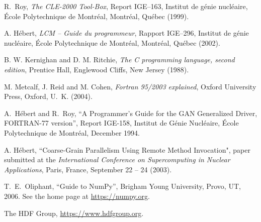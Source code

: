 \begin{thebibliography}{99}

R.~Roy,  \textsl{The CLE-2000 Tool-Box}, 
Report IGE--163, Institut de g\'enie nucl\'eaire, \'{E}cole Polytechnique de Montr\'eal,
Montr\'{e}al, Qu\'{e}bec (1999).

A. H\'ebert, \textsl{LCM -- Guide du programmeur}, 
Rapport IGE--296, Institut de g\'enie nucl\'eaire, \'{E}cole Polytechnique de Montr\'eal,
Montr\'{e}al, Qu\'{e}bec (2002).

B. W. Kernighan and D. M. Ritchie, \textsl{The C programming language, second edition},
Prentice Hall, Englewood Cliffs, New Jersey (1988).

M. Metcalf, J. Reid and M. Cohen, \textsl{Fortran 95/2003 explained},
Oxford University Press, Oxford, U.~K. (2004).

A.~H\'ebert and R.~Roy, ``A Programmer's Guide for the GAN Generalized Driver, FORTRAN-77 version'', Report IGE-158, Institut de G\'enie Nucl\'eaire, \'Ecole Polytechnique de Montr\'eal, December 1994.

A. H\'ebert, ``Coarse-Grain Parallelism Using Remote Method Invocation", paper submitted at the {\sl International Conference on Supercomputing in Nuclear Applications},
Paris, France, September 22 -- 24 (2003).

T.~E.~Oliphant, ``Guide to NumPy'', Brigham Young University, Provo, UT, 2006. See the home page at \url{https://numpy.org}.

The HDF Group, \url{https://www.hdfgroup.org}.

\end{thebibliography}
